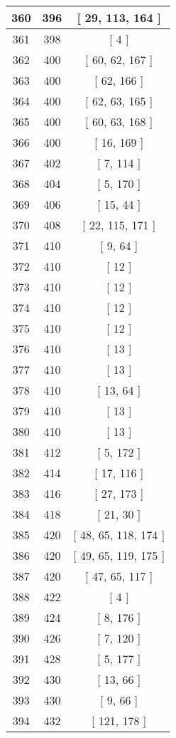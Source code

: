 \begin{center}
\begin{longtable}[H]{|| c c c ||}
\hline
360 & 396 & [ 29, 113, 164 ] \\ 
\hline
361 & 398 & [ 4 ] \\ 
\hline
362 & 400 & [ 60, 62, 167 ] \\ 
\hline
363 & 400 & [ 62, 166 ] \\ 
\hline
364 & 400 & [ 62, 63, 165 ] \\ 
\hline
365 & 400 & [ 60, 63, 168 ] \\ 
\hline
366 & 400 & [ 16, 169 ] \\ 
\hline
367 & 402 & [ 7, 114 ] \\ 
\hline
368 & 404 & [ 5, 170 ] \\ 
\hline
369 & 406 & [ 15, 44 ] \\ 
\hline
370 & 408 & [ 22, 115, 171 ] \\ 
\hline
371 & 410 & [ 9, 64 ] \\ 
\hline
372 & 410 & [ 12 ] \\ 
\hline
373 & 410 & [ 12 ] \\ 
\hline
374 & 410 & [ 12 ] \\ 
\hline
375 & 410 & [ 12 ] \\ 
\hline
376 & 410 & [ 13 ] \\ 
\hline
377 & 410 & [ 13 ] \\ 
\hline
378 & 410 & [ 13, 64 ] \\ 
\hline
379 & 410 & [ 13 ] \\ 
\hline
380 & 410 & [ 13 ] \\ 
\hline
381 & 412 & [ 5, 172 ] \\ 
\hline
382 & 414 & [ 17, 116 ] \\ 
\hline
383 & 416 & [ 27, 173 ] \\ 
\hline
384 & 418 & [ 21, 30 ] \\ 
\hline
385 & 420 & [ 48, 65, 118, 174 ] \\ 
\hline
386 & 420 & [ 49, 65, 119, 175 ] \\ 
\hline
387 & 420 & [ 47, 65, 117 ] \\ 
\hline
388 & 422 & [ 4 ] \\ 
\hline
389 & 424 & [ 8, 176 ] \\ 
\hline
390 & 426 & [ 7, 120 ] \\ 
\hline
391 & 428 & [ 5, 177 ] \\ 
\hline
392 & 430 & [ 13, 66 ] \\ 
\hline
393 & 430 & [ 9, 66 ] \\ 
\hline
394 & 432 & [ 121, 178 ] \\ 

\end{longtable}
\end{center}
